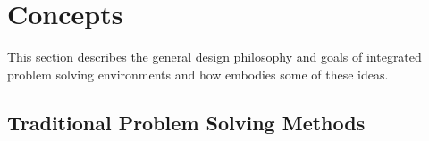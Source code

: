 %
% 
% 
% 
%  
% 
% 
%


\chapter{Concepts}
\label{ch:concepts} 

This section describes the general design philosophy and goals of
integrated problem solving environments  and how \sr{} embodies some of these ideas.

\section{Traditional Problem Solving Methods}

